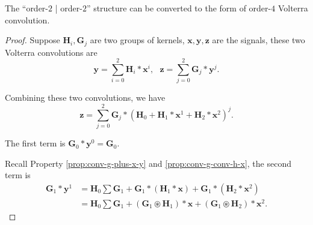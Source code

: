 \documentclass[twoside,11pt]{article}
\def\oconv{\circledast}
\def\tvar#1{\mathbf{#1}} %
\begin{document}
\begin{lemma}
  The ``order-\(2\) | order-\(2\)'' structure can be converted to the form of order-\(4\) Volterra convolution.
  \label{lemma:stacking-o2-vconv-o2-vconv-approximate-o4-vconv}
\end{lemma}

\begin{proof}
  Suppose \(\tvar{H}_i, \tvar{G}_j\) are two groups of kernels, \(\tvar{x}, \tvar{y}, \tvar{z}\) are the signals, these two Volterra convolutions are
  \begin{equation*}
    \tvar{y} = \sum_{i=0}^{2} \tvar{H}_i * \tvar{x}^{i}, ~~~
    \tvar{z} = \sum_{j=0}^{2} \tvar{G}_j * \tvar{y}^{j}.
  \end{equation*}

  Combining these two convolutions, we have
  \begin{equation*}
    \tvar{z} = \sum_{j=0}^{2} \tvar{G}_j * \left( \tvar{H}_0 + \tvar{H}_1 * \tvar{x}^{1} + \tvar{H}_2 * \tvar{x}^{2} \right)^j.
  \end{equation*}

  The first term is \(\tvar{G}_0 * \tvar{y}^0  = \tvar{G}_0\).

  Recall Property \ref{prop:conv-g-plus-x-y} and \ref{prop:conv-g-conv-h-x}, the second term is
  \begin{equation*}
    \begin{aligned}
      \tvar{G}_1 * \tvar{y}^1
       & = \tvar{H}_0 \sum \tvar{G}_1  + \tvar{G}_1 * (\tvar{H}_1 * \tvar{x}) + \tvar{G}_1 * (\tvar{H}_2 * \tvar{x}^2)           \\
       & = \tvar{H}_0 \sum \tvar{G}_1 + (\tvar{G}_1 \oconv \tvar{H}_1) * \tvar{x} + (\tvar{G}_1 \oconv \tvar{H}_2) * \tvar{x}^2.
    \end{aligned}
  \end{equation*}


\end{proof}
\end{document}
